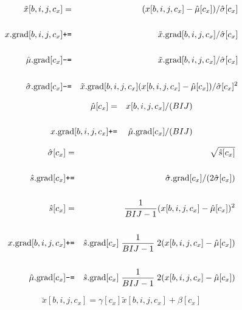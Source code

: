 {


\begin{eqnarray*}
  \tilde{x}[b,i,j,c_x]& = & (x[b,i,j,c_x] - \hat{\mu}[c_x])/\hat{\sigma}[c_x] \\
  \\
  x.\mathrm{grad}[b,i,j,c_x] & \mbox{\tt +=} & \tilde{x}.\mathrm{grad}[b,i,j,c_x]/{\hat{\sigma}[c_x]} \\
  \\
  \hat{\mu}.\mathrm{grad}[c_x] & \mbox{\tt -=} & \tilde{x}.\mathrm{grad}[b,i,j,c_x]/{\hat{\sigma}[c_x]} \\
  \\
  \hat{\sigma}.\mathrm{grad}[c_x] & \mbox{\tt -=} & \tilde{x}.\mathrm{grad}[b,i,j,c_x](x[b,i,j,c_x] - \hat{\mu}[c_x])/\hat{\sigma}[c_x]^2
\end{eqnarray*}




\begin{eqnarray*}
  \hat{\mu}[c_x] & = & x[b,i,j,c_x]/(BIJ) \\
  \\
  x.\mathrm{grad}[b,i,j,c_x] & \mbox{\tt +=} & \hat{\mu}.\mathrm{grad}[c_x]/(BIJ) \\
\end{eqnarray*}


\begin{eqnarray*}
  \hat{\sigma}[c_x] & = & \sqrt{\hat{s}[c_x]} \\
  \\
  \hat{s}.\mathrm{grad}[c_x] & \mbox{\tt +=} & \hat{\sigma}.\mathrm{grad}[c_x]/(2\hat{\sigma}[c_x]) \\
  \\
  \hat{s}[c_x] & = & \frac{1}{BIJ-1} (x[b,i,j,c_x]-\hat{\mu}[c_x])^2 \\
  \\
  x.\mathrm{grad}[b,i,j,c_x] & \mbox{\tt +=} & \hat{s}.\mathrm{grad}[c_x]\; \frac{1}{BIJ-1}\; 2(x[b,i,j,c_x]-\hat{\mu}[c_x]) \\
  \\
  \hat{\mu}.\mathrm{grad}[c_x] & \mbox{\tt -=} & \hat{s}.\mathrm{grad}[c_x]\; \frac{1}{BIJ-1}\; 2(x[b,i,j,c_x]-\hat{\mu}[c_x])
\end{eqnarray*}


$$\breve{x}[b,i,j,c_x] = \gamma[c_x] \tilde{x}[b,i,j,c_x] + \beta[c_x]$$

}
